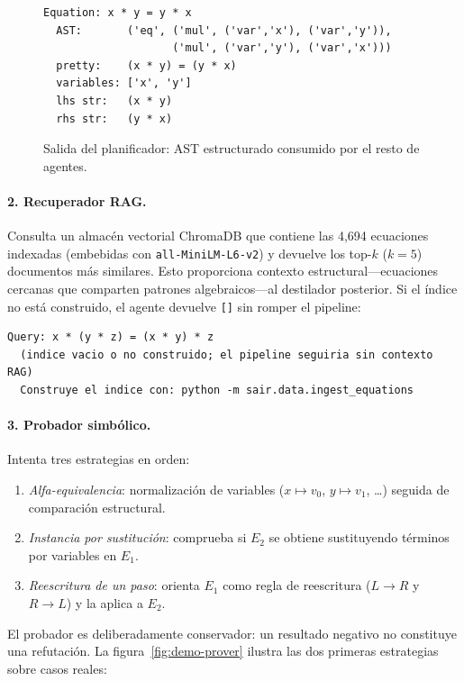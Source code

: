 \documentclass{article}
\begin{document}
\begin{figure}[h]
\centering
\begin{minipage}{0.95\linewidth}
\begin{verbatim}
Equation: x * y = y * x
  AST:       ('eq', ('mul', ('var','x'), ('var','y')),
                    ('mul', ('var','y'), ('var','x')))
  pretty:    (x * y) = (y * x)
  variables: ['x', 'y']
  lhs str:   (x * y)
  rhs str:   (y * x)
\end{verbatim}
\end{minipage}
\caption{Salida del planificador: AST estructurado consumido por el resto de agentes.}
\label{fig:demo-parser}
\end{figure}

\paragraph{2. Recuperador RAG.} Consulta un almac\'en vectorial ChromaDB que contiene las 4{,}694 ecuaciones indexadas (embebidas con \texttt{all-MiniLM-L6-v2}) y devuelve los top-$k$ ($k{=}5$) documentos m\'as similares. Esto proporciona contexto estructural---ecuaciones cercanas que comparten patrones algebraicos---al destilador posterior. Si el \'indice no est\'a construido, el agente devuelve \texttt{[]} sin romper el pipeline:

\begin{verbatim}
Query: x * (y * z) = (x * y) * z
  (indice vacio o no construido; el pipeline seguiria sin contexto RAG)
  Construye el indice con: python -m sair.data.ingest_equations
\end{verbatim}

\paragraph{3. Probador simb\'olico.} Intenta tres estrategias en orden:
\begin{enumerate}[label=(\alph*),itemsep=1pt]
  \item \textit{Alfa-equivalencia}: normalizaci\'on de variables ($x \mapsto v_0$, $y \mapsto v_1$, \dots) seguida de comparaci\'on estructural.
  \item \textit{Instancia por sustituci\'on}: comprueba si $E_2$ se obtiene sustituyendo t\'erminos por variables en $E_1$.
  \item \textit{Reescritura de un paso}: orienta $E_1$ como regla de reescritura ($L \to R$ y $R \to L$) y la aplica a $E_2$.
\end{enumerate}
El probador es deliberadamente conservador: un resultado negativo no constituye una refutaci\'on. La figura~\ref{fig:demo-prover} ilustra las dos primeras estrategias sobre casos reales:
\end{document}
